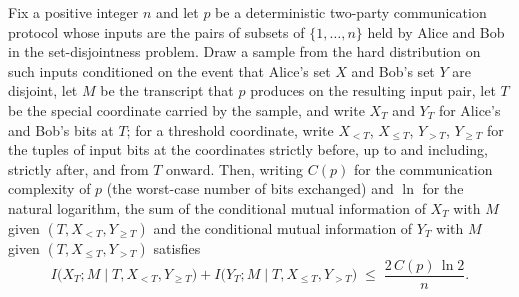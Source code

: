 \begin{theorem}
\label{CommunicationComplexity.Functions.Disjointness.RandomizedLowerBound.claimInfo_le_average_info_upper}
\leanok
{}
Fix a positive integer $n$ and let $p$ be a deterministic two-party communication
protocol whose inputs are the pairs of subsets of $\{1,\dots,n\}$ held by Alice and Bob
in the set-disjointness problem. Draw a sample from the hard distribution on such inputs
conditioned on the event that Alice's set $X$ and Bob's set $Y$ are disjoint, let $M$ be
the transcript that $p$ produces on the resulting input pair, let $T$ be the special
coordinate carried by the sample, and write $X_T$ and $Y_T$ for Alice's and Bob's bits
at $T$; for a threshold coordinate, write $X_{<T}$, $X_{\le T}$, $Y_{>T}$, $Y_{\ge T}$
for the tuples of input bits at the coordinates strictly before, up to and including,
strictly after, and from $T$ onward. Then, writing $C(p)$ for the communication
complexity of $p$ (the worst-case number of bits exchanged) and $\ln$ for the natural
logarithm, the sum of the conditional mutual information of $X_T$ with $M$ given $(T,
X_{<T}, Y_{\ge T})$ and the conditional mutual information of $Y_T$ with $M$ given $(T,
X_{\le T}, Y_{>T})$ satisfies
\[
I\bigl(X_T ; M \mid T, X_{<T}, Y_{\ge T}\bigr) + I\bigl(Y_T ; M \mid T, X_{\le T},
Y_{>T}\bigr) \;\le\; \frac{2\, C(p)\, \ln 2}{n}.
\]
\end{theorem}

